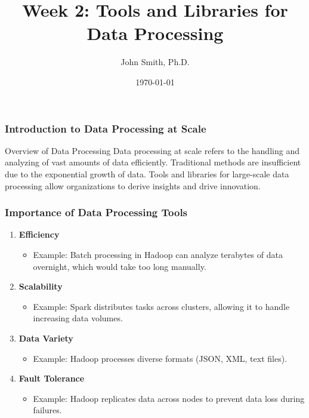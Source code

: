 \documentclass[aspectratio=169]{beamer}
\title[Week 2: Tools and Libraries for Data Processing]{Week 2: Tools and Libraries for Data Processing}
\author[J. Smith]{John Smith, Ph.D.}
\institute[University Name]{
  Department of Computer Science\\
  University Name\\
  \vspace{0.3cm}
  Email: email@university.edu\\
  Website: www.university.edu
}
\date{\today}
\begin{document}
\frame{\titlepage}

\begin{frame}[fragile]
    \frametitle{Introduction to Data Processing at Scale}
    \begin{block}{Overview of Data Processing}
        Data processing at scale refers to the handling and analyzing of vast amounts of data efficiently. Traditional methods are insufficient due to the exponential growth of data. Tools and libraries for large-scale data processing allow organizations to derive insights and drive innovation.
    \end{block}
\end{frame}

\begin{frame}[fragile]
    \frametitle{Importance of Data Processing Tools}
    \begin{enumerate}
        \item \textbf{Efficiency}
            \begin{itemize}
                \item Example: Batch processing in Hadoop can analyze terabytes of data overnight, which would take too long manually.
            \end{itemize}
        
        \item \textbf{Scalability}
            \begin{itemize}
                \item Example: Spark distributes tasks across clusters, allowing it to handle increasing data volumes.
            \end{itemize}
        
        \item \textbf{Data Variety}
            \begin{itemize}
                \item Example: Hadoop processes diverse formats (JSON, XML, text files).
            \end{itemize}
        
        \item \textbf{Fault Tolerance}
            \begin{itemize}
                \item Example: Hadoop replicates data across nodes to prevent data loss during failures.
            \end{itemize}
    \end{enumerate}
\end{frame}
\end{document}
